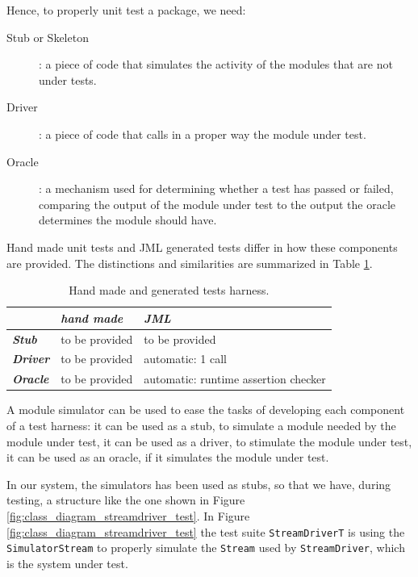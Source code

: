 \documentclass{article} \usepackage{times}
\newcommand{\lil}[1]{\texttt{\lstinline|#1|}}
\begin{document}
Hence, to properly unit test a package, we need:

\begin{description}
\item[Stub or Skeleton]: a piece of code that simulates the activity
  of the modules that are not under tests.
\item[Driver]: a piece of code that calls in a proper way the module
  under test.
\item[Oracle]: a mechanism used for determining whether a test has
  passed or failed, comparing the output of the module under test to
  the output the oracle determines the module should have.
\end{description}

Hand made unit tests and JML generated tests differ in how these
components are provided.  The distinctions and similarities are
summarized in Table \ref{tab:test_harness}.

\begin{table}[htbp]
  \caption{Hand made and generated tests harness.}
  \label{tab:test_harness}
  \begin{center}
    \begin{tabular}{|l|l|l|}\hline
      & \textbf{\textit{hand made}} & \textbf{\textit{JML}} \\\hline
      \textbf{\textit{Stub}} & to be provided & to be provided\\\hline
      \textbf{\textit{Driver}} & to be provided & automatic: 1 call\\\hline
      \textbf{\textit{Oracle}} & to be provided & 
      automatic: runtime assertion checker\\\hline
    \end{tabular}
  \end{center}
\end{table}

A module simulator can be used to ease the tasks of developing each
component of a test harness: it can be used as a stub, to simulate a
module needed by the module under test, it can be used as a driver, to
stimulate the module under test, it can be used as an oracle, if it
simulates the module under test.

In our system, the simulators has been used as stubs, so that we have,
during testing, a structure like the one shown in Figure
\ref{fig:class_diagram_streamdriver_test}.  In Figure
\ref{fig:class_diagram_streamdriver_test} the test suite
\lil{StreamDriverT} is using the \lil{SimulatorStream} to properly
simulate the \lil{Stream} used by \lil{StreamDriver}, which is the
system under test.
\end{document}
